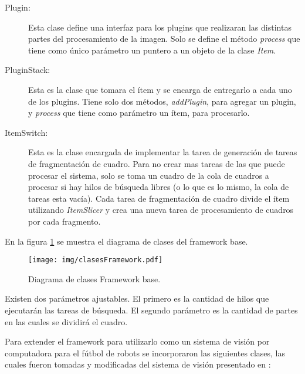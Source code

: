 \begin{description}
	\item[Plugin:] Esta clase define una interfaz para los plugins que
		realizaran las distintas partes del procesamiento de la imagen.
		Solo se define el método \emph{process} que tiene como único
		parámetro un puntero a un objeto de la clase \emph{Item}.

	\item[PluginStack:] Esta es la clase que tomara el ítem y se encarga de
		entregarlo a cada uno de los plugins. Tiene solo dos métodos,
		\emph{addPlugin}, para agregar un plugin, y \emph{process} que
		tiene como parámetro un ítem, para procesarlo.

	\item[ItemSwitch:] Esta es la clase encargada de implementar la tarea de
		generación de tareas de fragmentación de cuadro. Para no crear
		mas tareas de las que puede procesar el sistema, solo se toma un
		cuadro de la cola de cuadros a procesar si hay hilos de búsqueda
		libres (o lo que es lo mismo, la cola de tareas esta vacía).
		Cada tarea de fragmentación de cuadro divide el ítem utilizando
		\emph{ItemSlicer} y crea una nueva tarea de procesamiento de
		cuadros por cada fragmento.

\end{description}

En la figura \ref{clasesFramework} se muestra el diagrama de clases del
framework base.

\begin{figure}[h]

	\texttt{[image: img/clasesFramework.pdf]}

	\caption{Diagrama de clases Framework base.}

	\label{clasesFramework}

\end{figure}

Existen dos parámetros ajustables. El primero es la cantidad de hilos que
ejecutarán las tareas de búsqueda. El segundo parámetro es la cantidad de partes
en las cuales se dividirá el cuadro.

Para extender el framework para utilizarlo como un sistema de visión por
computadora para el fútbol de robots se incorporaron las siguientes clases, las
cuales fueron tomadas y modificadas del sistema de visión presentado en
\cite{torres2014}:

